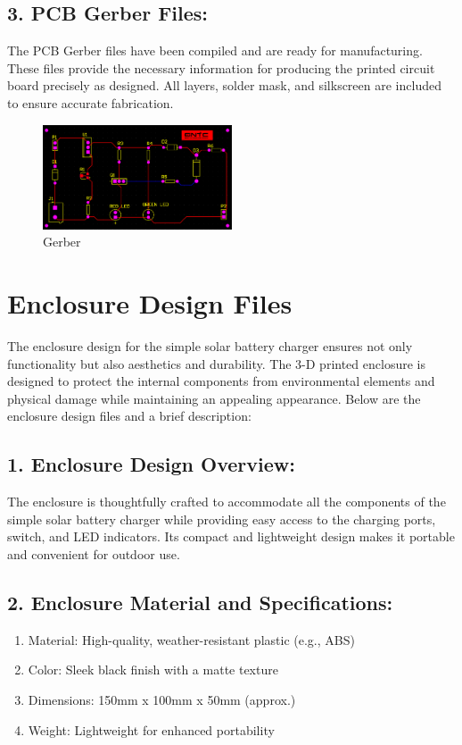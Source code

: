 \documentclass[twocolumn]{article}
\begin{document}
\subsection*{3. PCB Gerber Files:}

The PCB Gerber files have been compiled and are ready for manufacturing. These files provide the necessary information for producing the printed circuit board precisely as designed. All layers, solder mask, and silkscreen are included to ensure accurate fabrication.

\begin{figure}[h]
\centering
\includegraphics[width=0.5\textwidth]{15.png}
\caption{Gerber}
\end{figure}

\section*{Enclosure Design Files}
The enclosure design for the simple solar battery charger ensures not only functionality but also aesthetics and durability. The 3-D printed enclosure is designed to protect the internal components from environmental elements and physical damage while maintaining an appealing appearance. Below are the enclosure design files and a brief description:

\subsection*{1. Enclosure Design Overview:}
The enclosure is thoughtfully crafted to accommodate all the components of the simple solar battery charger while providing easy access to the charging ports, switch, and LED indicators. Its compact and lightweight design makes it portable and convenient for outdoor use.

\subsection*{2. Enclosure Material and Specifications:}

\begin{enumerate}
    \item Material: High-quality, weather-resistant plastic (e.g., ABS)
    \item Color: Sleek black finish with a matte texture
    \item Dimensions: 150mm x 100mm x 50mm (approx.)
    \item Weight: Lightweight for enhanced portability
\end{enumerate}
\end{document}
